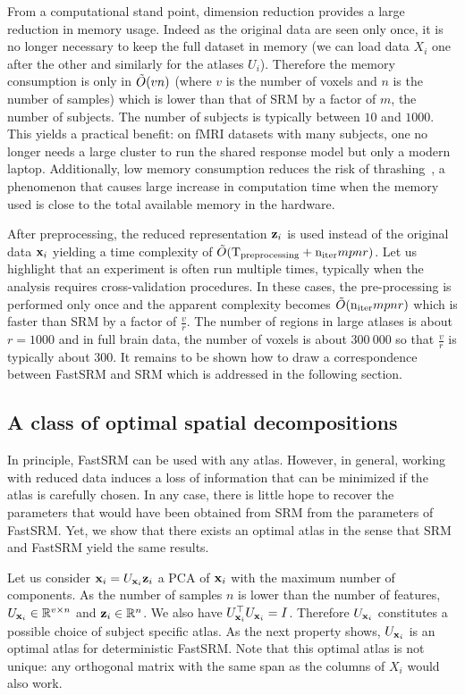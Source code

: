 \documentclass{article}
\newcommand{\bt}[1]{\todo[color=orange, inline=True]{BT: #1}}
\begin{document}
From a computational stand point, dimension reduction provides
a large reduction in memory usage.
%
Indeed as the original data are seen only
once, it is no longer necessary to keep the full dataset in memory (we can load
data $X_i$ one after the other and similarly for the atlases $U_i$).
%
Therefore
the memory consumption is only in $\tilde{O}(vn)$ (where $v$ is the number of voxels
and $n$ is the number of samples) which is lower than that of SRM by a factor of $m$,
the number of subjects.
%
The number of subjects is typically between $10$ and
$1000$.
%
This yields a practical benefit: on fMRI datasets with many subjects, one no
longer needs a large cluster to run the shared response model but only a modern
laptop.
%
Additionally, low memory consumption reduces the
risk of thrashing~\cite{denning1968thrashing}, a phenomenon that causes large
increase in computation time when the memory used is close to the total available
memory in the hardware.
%


After preprocessing, the reduced representation $\mathbf{z}_i$ is used instead of the
original data $\mathbf{x}_i$ yielding a time complexity of $\tilde{O}(
\mathrm{T_{preprocessing}} + \mathrm{n_{iter}} mpnr)$.
%
Let us highlight that an experiment is often run multiple times,
typically when the analysis requires cross-validation procedures.
%
In these cases,
the pre-processing is performed only once and the apparent complexity becomes
$\tilde{O}(\mathrm{n_{iter}} mpnr)$ which is faster than SRM by
a factor of $\frac{v}{r}$.
%
The number of regions in large atlases is about $r=1000$ and in full brain data,
the number of voxels is about $300~000$ so that $\frac{v}{r}$ is typically about
$300$.
%
It remains to be shown how to draw a correspondence between FastSRM and SRM which is
addressed in the following section.
%


\subsection{A class of optimal spatial decompositions}
\label{sec:optimal_atlas}
In principle, FastSRM can be used with any atlas.
%
However, in general, working with reduced data induces a loss of information
that can be minimized if the atlas is carefully chosen.
%
In any case, there is little hope to recover the parameters that would have been
obtained from SRM from the parameters of FastSRM.
%
Yet, we show that there exists an optimal atlas in the
sense that SRM and FastSRM yield the same results.


Let us consider $\mathbf{x}_i = U_{\mathbf{x}_i} \mathbf{z}_i$
%
%
a PCA of $\mathbf{x}_i$ with the maximum
number of components.
%
As the number of
samples $n$ is lower than the number of features, $U_{\mathbf{x}_i} \in \mathbb{R}^{v \times
  n}$ and $\mathbf{z}_i \in \mathbb{R}^{n}$.
%
We also have $U_{\mathbf{x}_i}^{\top}U_{\mathbf{x}_i} = I$.
%
Therefore $U_{\mathbf{x}_i}$ constitutes a possible choice of subject specific atlas.
%
As the next property shows, $U_{\mathbf{x}_i}$ is an optimal atlas for deterministic
FastSRM. Note that this optimal atlas is not unique: any orthogonal matrix with
the same span as the columns of $X_i$ would also work.
%
\end{document}
